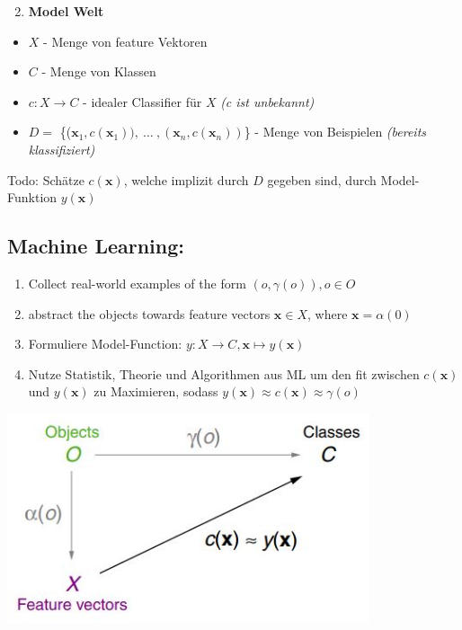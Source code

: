 \documentclass[11pt,a4paper]{article}
\begin{document}
\begin{flushleft}
    \begin{enumerate}
        \setcounter{enumi}{1}
        \item \textbf{Model Welt}
    \end{enumerate}
     \begin{itemize}
         \item $X$ - Menge von feature Vektoren
         \item $C$ - Menge von Klassen
         \item $c: X \rightarrow C$ - idealer Classifier für $X$ \textit{(c ist unbekannt)}
         \item $ D =$ \{($\textbf{x}_1,c(\textbf{x}_1)),\ \dots\ ,(\textbf{x}_n, c( \textbf{x}_n)) $\} - Menge von Beispielen \textit{(bereits klassifiziert)}
     \end{itemize}
    Todo: Schätze $c(\mathbf{x})$, welche implizit durch $D$ gegeben sind, durch
    \newline \quad Model-Funktion $y(\mathbf{x})$ 
    \newline\newline
\subsection{Machine Learning:}
    \begin{enumerate}
    	\item Collect real-world examples of the form $(o, \gamma (o) ), o \in O $
    	\item abstract the objects towards feature vectors $ \textbf{x} \in X$, where $\textbf{x} = \alpha (0)$
        \item Formuliere Model-Function: $y: X \rightarrow C, \mathbf{x} \mapsto y(\mathbf{x})$
        \item Nutze Statistik, Theorie und Algorithmen aus ML um den fit zwischen $c(\mathbf{x})$ und $y(\mathbf{x})$ zu Maximieren, sodass $y(\textbf{x} ) \approx c( \textbf{x} ) \approx \gamma (o)$
    \end{enumerate}
    \includegraphics[width= 0.8\textwidth]{modelworld}
    

\end{flushleft}
\end{document}
